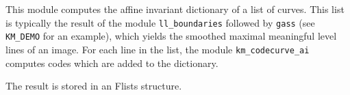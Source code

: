This module computes the affine invariant dictionary of a list of curves. 
This list is typically the result of the module \verb+ll_boundaries+ 
followed by \verb+gass+ (see \verb+KM_DEMO+ for an example), 
which yields the smoothed maximal meaningful 
level lines of an image. For each line in the list, the module 
\verb+km_codecurve_ai+ computes codes which are added to the dictionary.

\medskip

The result is stored in an Flists structure.


